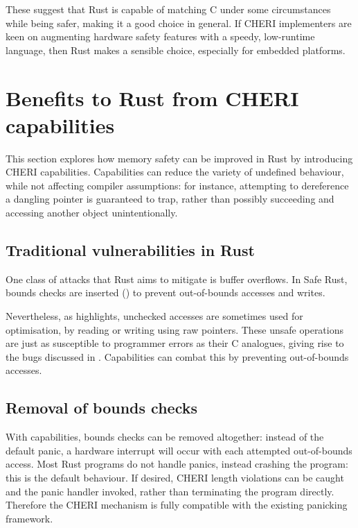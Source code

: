 \documentclass[dissertation.tex]{subfiles}
\begin{document}
These suggest that Rust is capable of matching C under some
circumstances while being safer, making it a good choice in general.
If CHERI implementers are keen on augmenting hardware safety features
with a speedy, low-runtime language, then Rust makes a sensible choice,
especially for embedded platforms.


\section{Benefits to Rust from CHERI capabilities}
\label{sec:eval-rust}

This section explores how memory safety can be improved in Rust by
introducing CHERI capabilities.
Capabilities can reduce the variety of undefined behaviour, while not
affecting compiler assumptions: for instance, attempting to dereference
a dangling pointer is guaranteed to trap, rather than possibly
succeeding and accessing another object unintentionally.

\subsection{Traditional vulnerabilities in Rust}
\label{sec:eval-rust-vulns}

One class of attacks that Rust aims to mitigate is buffer overflows.
In Safe Rust, bounds checks are inserted ()
to prevent out-of-bounds accesses and writes.

Nevertheless, as  highlights, unchecked accesses
are sometimes used for optimisation, by reading or writing using raw
pointers.
These unsafe operations are just as susceptible to programmer errors as
their C analogues, giving rise to the bugs discussed in
.
Capabilities can combat this by preventing out-of-bounds accesses.


\subsection{Removal of bounds checks}
\label{sec:eval-rust-bounds}

With capabilities, bounds checks can be removed altogether: instead of
the default panic, a hardware interrupt will occur with each attempted
out-of-bounds access.
Most Rust programs do not handle panics, instead crashing the program:
this is the default behaviour.
If desired, CHERI length violations can be caught and the panic handler
invoked, rather than terminating the program directly.
Therefore the CHERI mechanism is fully compatible with the existing
panicking framework.
\end{document}
